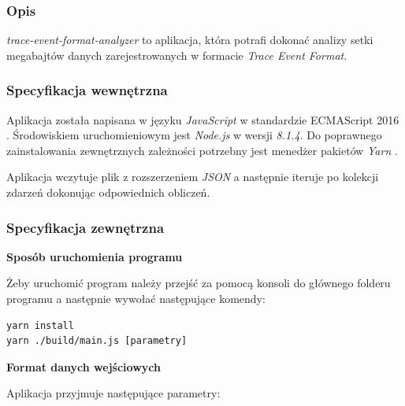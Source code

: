 \documentclass[polish, twoside, 12pt]{mwart}
\begin{document}
\subsubsection{Opis}

\emph{trace-event-format-analyzer} to aplikacja, która potrafi dokonać analizy setki megabajtów danych zarejestrowanych w formacie \emph{Trace Event Format}.

\subsubsection{Specyfikacja wewnętrzna}

Aplikacja została napisana w języku \emph{JavaScript} w standardzie ECMAScript 2016 \cite{es2016}. Środowiskiem uruchomieniowym jest \emph{Node.js} \cite{node.js} w wersji \emph{8.1.4}. Do poprawnego zainstalowania zewnętrznych zależności potrzebny jest menedżer pakietów \emph{Yarn} \cite{yarn}.

Aplikacja wczytuje plik z rozszerzeniem \emph{JSON} a następnie iteruje po kolekcji zdarzeń dokonując odpowiednich obliczeń.

\subsubsection{Specyfikacja zewnętrzna}

\textbf{Sposób uruchomienia programu} \newline

Żeby uruchomić program należy przejść za pomocą konsoli do głównego folderu programu a następnie wywołać następujące komendy:

\begin{lstlisting}
yarn install
yarn ./build/main.js [parametry]
\end{lstlisting}

\textbf{Format danych wejściowych} \newline

Aplikacja przyjmuje następujące parametry:
\end{document}
